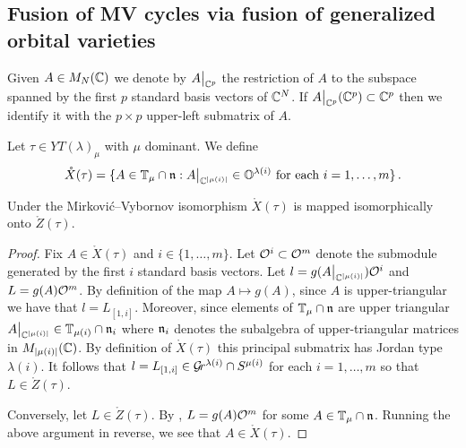 \documentclass[draft]{article} %
\begin{document}
\subsection{Fusion of MV cycles via fusion of generalized orbital varieties}


Given $A \in M_N(\mathbb C)$ we denote by $A\big|_{\mathbb C^p}$ the restriction of $A$ to the subspace spanned by the first $p$ standard basis vectors of $\mathbb C^N$.  If $A\big|_{\mathbb C^p}(\mathbb C^p)\subset\mathbb C^p$ then we identify it with the $p\times p$ upper-left submatrix of $A$. 

Let $\tau\in YT(\lambda)_\mu$ with $\mu$ dominant. 
We define
\[
\mathring X(\tau) = 
    \{
        A \in  \mathbb T_\mu\cap\mathfrak n : A\big|_{\mathbb C^{|\mu(i)|}} \in \mathbb O^{\lambda(i)} \text{ for each } i = 1,\dots,m
    \}\,.
\]

\begin{lemma}
    \label{lem:XtZt}
    Under the Mirkovi\'c--Vybornov isomorphism $\mathring X(\tau)$ is mapped isomorphically onto $\mathring Z(\tau)$. 
\end{lemma}
\begin{proof}
Fix $A\in\mathring X(\tau)$ and $i\in\{1,\dots,m\}$. Let $\mathcal O^i\subset\mathcal O^m$ denote the submodule generated by the first $i$ standard basis vectors. Let $l = g(A\big|_{\mathbb C^{\lvert\mu(i)\rvert}}) \mathcal O^i$ and $L = g(A) \mathcal O^m$. By definition of the map $A \mapsto g(A)$, since $ A $ is upper-triangular we have that $l = L_{[1,i]}$. 
Moreover, since elements of $\mathbb T_\mu\cap\mathfrak n$ are upper triangular $A\big|_{\mathbb C^{\lvert\mu(i)\rvert}}\in\mathbb T_{\mu(i)}\cap\mathfrak n_i$ where $\mathfrak n_i$ denotes the subalgebra of upper-triangular matrices in $M_{\lvert\mu(i)\rvert}(\mathbb C)$. 
By definition of $\mathring X(\tau)$ this principal submatrix has Jordan type $\lambda(i)$. It follows that $l = L_{[1,i]} \in \mathcal{G}\!r^{\lambda(i)} \cap S^{\mu(i)}$ for each $i=1,\dots,m$ so that $L\in\mathring Z(\tau)$. 

Conversely, let $ L \in \mathring Z(\tau) $.  By , $ L = g(A)\mathcal O^m$ for some $ A \in \mathbb T_\mu \cap \mathfrak n $.  Running the above argument in reverse, we see that $ A \in \mathring X(\tau)$. 
\end{proof}
\end{document}
